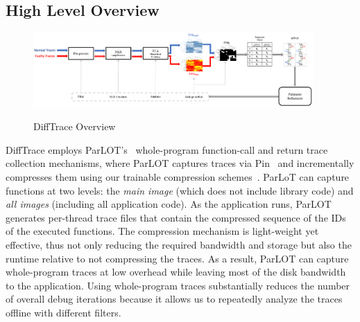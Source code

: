 \subsection{High Level Overview}

\begin{figure}[]
\caption{DiffTrace Overview}
\includegraphics[width=0.95\textwidth]{figs/overview.png}
\label{fig.diffTraceOverview}
\end{figure}

DiffTrace employs
ParLOT's~\cite{parlot} whole-program function-call and return trace collection
mechanisms, where ParLOT captures traces
via Pin~\cite{pin} and incrementally compresses them using our trainable
compression schemes~\cite{martin-compression-paper}.
%
ParLoT can capture functions at two levels:
the \textit{main image} (which does not include library code)
and \textit{all images} (including all application code).
%
As the application runs,
ParLOT generates per-thread trace files that
contain the compressed sequence of the IDs of the executed functions.
%
The compression mechanism is light-weight yet effective,
thus not only reducing the required bandwidth and storage but also the
runtime relative to not compressing the traces.
As a result, ParLOT can capture whole-program traces at low overhead
while leaving most of the disk bandwidth to the application. 
%
Using whole-program traces substantially reduces the number of overall
debug iterations because it allows us to repeatedly analyze the
traces offline with different filters.


